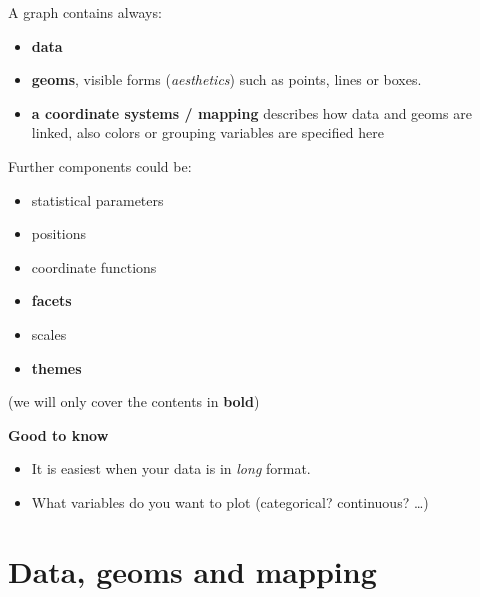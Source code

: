 \documentclass[
  letterpaper,
  DIV=11,
  numbers=noendperiod,
  oneside]{scrreprt}
\begin{document}
A graph contains always:

\begin{itemize}
\item
  \textbf{data}
\item
  \textbf{geoms}, visible forms (\emph{aesthetics}) such as points,
  lines or boxes.
\item
  \textbf{a coordinate systems / mapping} describes how data and geoms
  are linked, also colors or grouping variables are specified here
\end{itemize}

Further components could be:

\begin{itemize}
\item
  statistical parameters
\item
  positions
\item
  coordinate functions
\item
  \textbf{facets}
\item
  scales
\item
  \textbf{themes}
\end{itemize}

(we will only cover the contents in \textbf{bold})

\begin{tcolorbox}[enhanced jigsaw, leftrule=.75mm, colframe=quarto-callout-tip-color-frame, left=2mm, breakable, bottomrule=.15mm, rightrule=.15mm, colback=white, opacityback=0, arc=.35mm, toprule=.15mm]
\begin{minipage}[t]{5.5mm}
\textcolor{quarto-callout-tip-color}{\faLightbulb}
\end{minipage}%
\begin{minipage}[t]{\textwidth - 5.5mm}

\textbf{Good to know}\vspace{2mm}

\begin{itemize}
\item
  It is easiest when your data is in \emph{long} format.
\item
  What variables do you want to plot (categorical? continuous? \ldots)
\end{itemize}

\end{minipage}%
\end{tcolorbox}

\hypertarget{data-geoms-and-mapping}{%
\section{Data, geoms and mapping}\label{data-geoms-and-mapping}}
\end{document}
